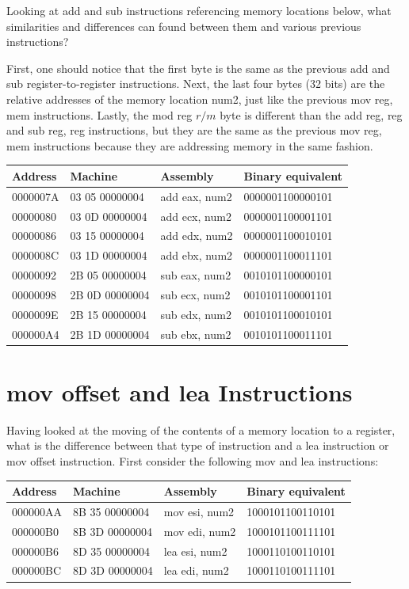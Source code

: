 \documentclass[10pt]{book}
\begin{document}
Looking at add and sub instructions referencing memory locations below, what similarities and differences can found between them and various previous instructions?

First, one should notice that the first byte is the same as the previous add and sub register-to-register instructions. Next, the last four bytes (32 bits) are the relative addresses of the memory location num2, just like the previous mov reg, mem instructions. Lastly, the mod reg $r / m$ byte is different than the add reg, reg and sub reg, reg instructions, but they are the same as the previous mov reg, mem instructions because they are addressing memory in the same fashion.

\begin{center}
\begin{tabular}{|l|l|l|l|}
\hline
Address & Machine & Assembly & Binary equivalent \\
\hline
0000007A & 03 05 00000004 & add eax, num2 & 0000001100000101 \\
\hline
00000080 & 03 0D 00000004 & add ecx, num2 & 0000001100001101 \\
\hline
00000086 & 03 15 00000004 & add edx, num2 & 0000001100010101 \\
\hline
0000008C & 03 1D 00000004 & add ebx, num2 & 0000001100011101 \\
\hline
00000092 & 2B 05 00000004 & sub eax, num2 & 0010101100000101 \\
\hline
00000098 & 2B 0D 00000004 & sub ecx, num2 & 0010101100001101 \\
\hline
0000009E & 2B 15 00000004 & sub edx, num2 & 0010101100010101 \\
\hline
000000A4 & 2B 1D 00000004 & sub ebx, num2 & 0010101100011101 \\
\hline
\end{tabular}
\end{center}

\section{mov offset and lea Instructions}
Having looked at the moving of the contents of a memory location to a register, what is the difference between that type of instruction and a lea instruction or mov offset instruction. First consider the following mov and lea instructions:

\begin{center}
\begin{tabular}{|l|l|l|l|}
\hline
Address & Machine & Assembly & Binary equivalent \\
\hline
000000AA & 8B 35 00000004 & mov esi, num2 & 1000101100110101 \\
\hline
000000B0 & 8B 3D 00000004 & mov edi, num2 & 1000101100111101 \\
\hline
000000B6 & 8D 35 00000004 & lea esi, num2 & 1000110100110101 \\
\hline
000000BC & 8D 3D 00000004 & lea edi, num2 & 1000110100111101 \\
\hline
\end{tabular}
\end{center}
\end{document}
